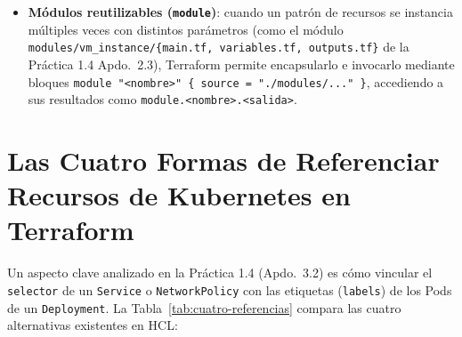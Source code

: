 \begin{itemize}
\begin{lstlisting}[language=HCL,caption={Consulta dinámica de Pods con \texttt{data "kubernetes\_resources"} y bloque \texttt{output} en \texttt{outputs.tf}.}]
output "web_pod_names" {
  value = [for pod in data.kubernetes_resources.web_pods.objects : pod.metadata.name]
}
\end{lstlisting}
  Los valores expuestos pueden consultarse en cualquier momento con \texttt{terraform output}, de forma individual (\texttt{terraform output web\_ingress\_url}) o en formato estructurado para scripts (\texttt{terraform output -json}).
  \item \textbf{Módulos reutilizables (\texttt{module})}: cuando un patrón de recursos se instancia múltiples veces con distintos parámetros (como el módulo \texttt{modules/vm\_instance/\{main.tf, variables.tf, outputs.tf\}} de la Práctica 1.4 Apdo.~2.3), Terraform permite encapsularlo e invocarlo mediante bloques \texttt{module "<nombre>" \{ source = "./modules/..." \}}, accediendo a sus resultados como \texttt{module.<nombre>.<salida>}.
\end{itemize}

\section{Las Cuatro Formas de Referenciar Recursos de Kubernetes en Terraform}

Un aspecto clave analizado en la Práctica 1.4 (Apdo.~3.2) es cómo vincular el \texttt{selector} de un \texttt{Service} o \texttt{NetworkPolicy} con las etiquetas (\texttt{labels}) de los Pods de un \texttt{Deployment}. La Tabla~\ref{tab:cuatro-referencias} compara las cuatro alternativas existentes en HCL:

